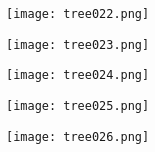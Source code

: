 \begin{frame}
\begin{figure}
    \texttt{[image: tree022.png]}
\end{figure}
\end{frame}
\begin{frame}
\begin{figure}
    \texttt{[image: tree023.png]}
\end{figure}
\end{frame}
\begin{frame}
\begin{figure}
    \texttt{[image: tree024.png]}
\end{figure}
\end{frame}
\begin{frame}
\begin{figure}
    \texttt{[image: tree025.png]}
\end{figure}
\end{frame}
\begin{frame}
\begin{figure}
    \texttt{[image: tree026.png]}
\end{figure}
\end{frame}

